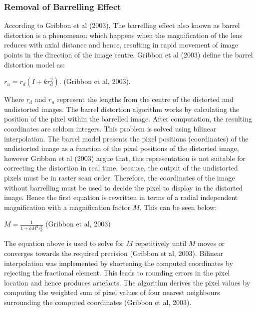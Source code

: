 \documentclass[a4paper, 12pt]{article}
\begin{document}
\subsubsection{ Removal of Barrelling Effect}

According to Gribbon et al (2003), The barrelling effect also known as barrel distortion is a phenomenon which happens when the magnification of the lens reduces with axial distance and hence, resulting in rapid movement of image points in the direction of the image centre. Gribbon et al (2003) define the barrel distortion model as: 
\begin{center}
 $r_{u} = r_{d}(I+kr^{2}_{d})$. (Gribbon et al, 2003).
\end{center}

Where $r_{d}$ and $r_{u}$  represent the lengths from the centre of the distorted and undistorted images. The barrel distortion algorithm works by calculating the position of the pixel within the barrelled image. After computation, the resulting coordinates are seldom integers. This problem is solved using bilinear interpolation. The barrel model presents the pixel positions (coordinates) of the undistorted image as a function of the pixel positions of the distorted image, however Gribbon et al (2003) argue that, this representation is not suitable for correcting the distortion in real time, because, the output of the undistorted pixels must be in raster scan order. Therefore, the coordinates of the image without barrelling must be used to decide the pixel to display in the distorted image. Hence the first equation is rewritten in terms of a radial independent magnification with a magnification factor $M$. This can be seen below: 

\begin{center}
$M = \frac{1}{1+kM^2r^{2}_{d}}$ (Gribbon et al, 2003)
\end{center}

The equation above is used to solve for $M$ repetitively until $M$ moves or converges towards the required precision (Gribbon et al, 2003). Bilinear interpolation was implemented by shortening the computed coordinates by rejecting the fractional element. This leads to rounding errors in the pixel location and hence produces artefacts. The algorithm derives the pixel values by computing the weighted sum of pixel values of four nearest neighbours surrounding the computed coordinates (Gribbon et al, 2003). 
\end{document}
